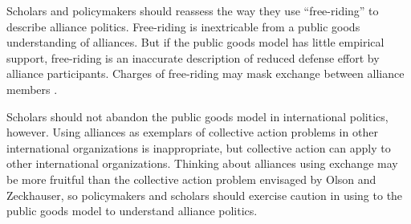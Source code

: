 \documentclass[12pt]{article}
\begin{document}
Scholars and policymakers should reassess the way they use ``free-riding'' to describe alliance politics. 
Free-riding is inextricable from a public goods understanding of alliances.
But if the public goods model has little empirical support, free-riding is an inaccurate description of reduced defense effort by alliance participants.  
Charges of free-riding may mask exchange between alliance members \citep{Lanoszka2015}. 


Scholars should not abandon the public goods model in international politics, however.   
Using alliances as exemplars of collective action problems in other international organizations is inappropriate, but collective action can apply to other international organizations. 
Thinking about alliances using exchange may be more fruitful than the collective action problem envisaged by Olson and Zeckhauser, so policymakers and scholars should exercise caution in using to the public goods model to understand alliance politics.  



\singlespace


 
\end{document}
